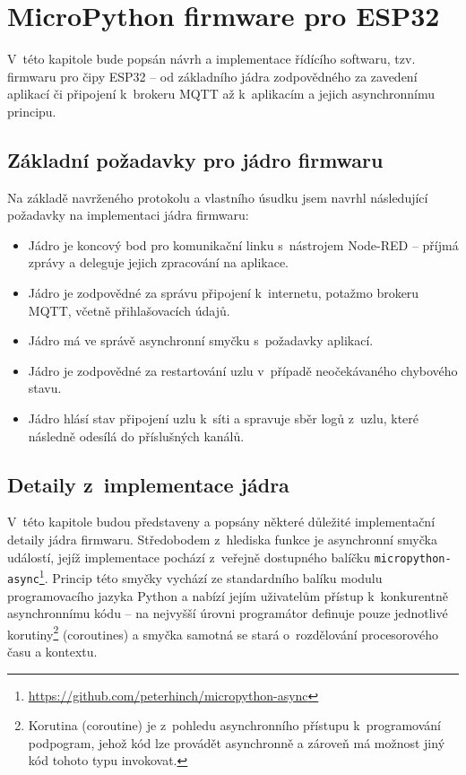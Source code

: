 \chapter{MicroPython firmware pro ESP32}
\label{ch:firmware}

V~této kapitole bude popsán návrh a implementace řídícího softwaru, tzv. firmwaru pro čipy ESP32 -- od základního
jádra zodpovědného za zavedení aplikací či připojení k~brokeru MQTT až k~aplikacím a jejich asynchronnímu principu.

\section{Základní požadavky pro jádro firmwaru}\label{sec:základní-požadavky-pro-jádro}
Na základě navrženého protokolu a vlastního úsudku jsem navrhl následující požadavky na implementaci jádra firmwaru:

\begin{itemize}
    \item Jádro je koncový bod pro komunikační linku s~nástrojem Node-RED -- příjmá zprávy a deleguje jejich
    zpracování na aplikace.
    \item Jádro je zodpovědné za správu připojení k~internetu, potažmo brokeru MQTT, včetně přihlašovacích údajů.
    \item Jádro má ve správě asynchronní smyčku s~požadavky aplikací.
    \item Jádro je zodpovědné za restartování uzlu v~případě neočekávaného chybového stavu.
    \item Jádro hlásí stav připojení uzlu k~síti a spravuje sběr logů z~uzlu, které následně odesílá do příslušných
    kanálů.
\end{itemize}

\section{Detaily z~implementace jádra}\label{sec:detaily-z-implementace-jadra}
V~této kapitole budou představeny a popsány některé důležité implementační detaily jádra firmwaru.
Středobodem z~hlediska funkce je asynchronní smyčka událostí, jejíž implementace pochází z~veřejně dostupného balíčku
\texttt{micropython-async}\footnote{\url{https://github.com/peterhinch/micropython-async}}.
Princip této smyčky vychází ze standardního balíku modulu  programovacího jazyka Python a nabízí
jejím uživatelům přístup k~konkurentně asynchronnímu kódu -- na nejvyšší úrovni programátor definuje pouze jednotlivé
korutiny\footnote{Korutina (coroutine) je z~pohledu asynchronního přístupu k~programování podpogram,
jehož kód lze provádět asynchronně a zároveň má možnost jiný kód tohoto typu invokovat.} (coroutines) a smyčka samotná
se stará o~rozdělování procesorového času a kontextu.


